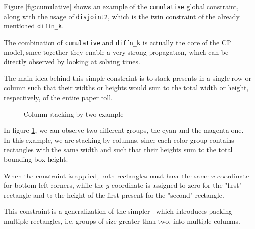 \documentclass[a4paper,10pt]{article}
\newcounter{subsubsubsection}[subsubsection]
\begin{document}
Figure \ref{fig:cumulative} shows an example of the \texttt{cumulative} global constraint, along with the usage of \texttt{disjoint2}, which is the twin constraint of the already mentioned \texttt{diffn\_k}.

The combination of \texttt{cumulative} and \texttt{diffn\_k} is actually the core of the CP model, since together they enable a very strong propagation, which can be directly observed by looking at solving times.

 \label{sec:stack-two}
The main idea behind this simple constraint is to stack presents in a single row or column such that their widths or heights would sum to the total width or height, respectively, of the entire paper roll.

\begin{figure}[h]
   \centering
   \caption{Column stacking by two example}
   \label{fig:col-stacking-two}
\end{figure}

In figure \ref{fig:col-stacking-two}, we can observe two different groups, the cyan and the magenta one. In this example, we are stacking by columns, since each color group contains rectangles with the same width and such that their heights sum to the total bounding box height.

When the constraint is applied, both rectangles must have the same $x$-coordinate for bottom-left corners, while the $y$-coordinate is assigned to zero for the "first" rectangle and to the height of the first present for the "second" rectangle.

 \label{sec:column-stacking}
This constraint is a generalization of the simpler , which introduces packing multiple rectangles, i.e. groups of size greater than two, into multiple columns.
\end{document}
